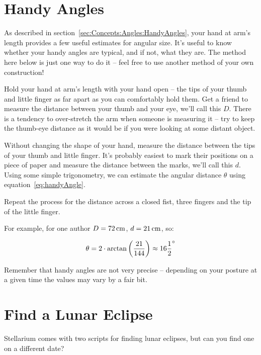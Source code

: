 \section{Handy Angles}
\label{sec:Exercises:handyAngles}


As described in section~\ref{sec:Concepts:Angles:HandyAngles}, 
your hand at arm's length provides a few useful estimates for angular
size. It's useful to know whether your handy angles are typical, and if not,
what they are. The method here below is just one way to do it -- feel
free to use another method of your own construction!

Hold your hand at arm's length with your hand open -- the tips of your
thumb and little finger as far apart as you can comfortably hold them.
Get a friend to measure the distance between your thumb and your eye,
we'll call this $D$. There is a tendency to over-stretch the arm
when someone is measuring it -- try to keep the thumb-eye distance as it
would be if you were looking at some distant object.

Without changing the shape of your hand, measure the distance between
the tips of your thumb and little finger. It's probably easiest to mark
their positions on a piece of paper and measure the distance between the
marks, we'll call this $d$. Using some simple trigonometry, we can
estimate the angular distance $\theta$ using equation~\eqref{eq:handyAngle}.

Repeat the process for the distance across a closed fist, three fingers
and the tip of the little finger.

For example, for one author $D=72\cm$, $d=21\cm$, so:

\begin{equation}
\theta = 2 \cdot \arctan{\left( \frac{21}{144} \right)} \approx 16 \frac{1}{2}\degree
\end{equation}

Remember that handy angles are not very precise -- depending on your
posture at a given time the values may vary by a fair bit.

\section{Find a Lunar Eclipse}
\label{sec:Exercises:LunarEclipse}

Stellarium comes with two scripts for finding lunar eclipses, but can
you find one on a different date?

